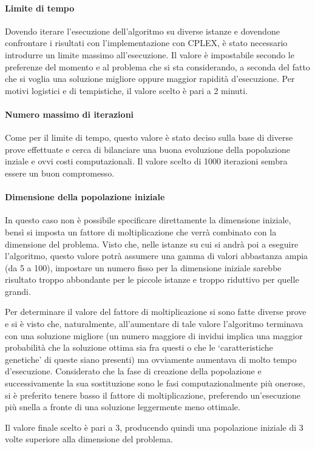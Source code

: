 \paragraph{Limite di tempo}
Dovendo iterare l'esecuzione dell'algoritmo su diverse istanze e dovendone confrontare i risultati
con l'implementazione con CPLEX, è stato necessario introdurre un limite massimo all'esecuzione.
Il valore è impostabile secondo le preferenze del momento e al problema che si sta considerando,
a seconda del fatto che si voglia una soluzione migliore oppure maggior rapidità d'esecuzione.
Per motivi logistici e di tempistiche, il valore scelto è pari a 2 minuti.
%
\paragraph{Numero massimo di iterazioni}
Come per il limite di tempo, questo valore è stato deciso sulla base di diverse prove effettuate
e cerca di bilanciare una buona evoluzione della popolazione inziale e ovvi costi computazionali.
Il valore scelto di 1000 iterazioni sembra essere un buon compromesso.
%
\paragraph{Dimensione della popolazione iniziale}
In questo caso non è possibile specificare direttamente la dimensione iniziale, bensì si imposta
un fattore di moltiplicazione che verrà combinato con la dimensione del problema.
Visto che, nelle istanze su cui si andrà poi a eseguire l'algoritmo, questo valore
potrà assumere una gamma di valori abbastanza ampia (da 5 a 100), impostare un numero fisso
per la dimensione iniziale sarebbe risultato troppo abbondante per le piccole istanze
e troppo riduttivo per quelle grandi.

Per determinare il valore del fattore di moltiplicazione si sono fatte diverse prove e si è visto
che, naturalmente, all'aumentare di tale valore l'algoritmo terminava con una soluzione migliore
(un numero maggiore di invidui implica una maggior probabilità che la soluzione ottima sia fra questi
o che le `caratteristiche genetiche' di queste siano presenti) ma ovviamente aumentava di molto tempo d'esecuzione.
Considerato che la fase di creazione della popolazione e successivamente la sua sostituzione sono le fasi
computazionalmente più onerose, si è preferito tenere basso il fattore di moltiplicazione, preferendo
un'esecuzione più snella a fronte di una soluzione leggermente meno ottimale.

Il valore finale scelto è pari a 3, producendo quindi una popolazione iniziale di 3 volte superiore
alla dimensione del problema.
%
